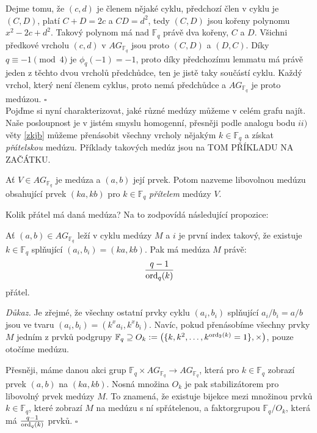 \documentclass[12pt]{report}
\begin{document}
Dejme tomu, že $(c,d)$ je členem nějaké cyklu, předchozí člen v cyklu je $(C,D)$, platí $C+D=2c$ a $CD = d^2$, tedy $(C,D)$ jsou kořeny polynomu $x^2-2c+d^2$. Takový polynom má nad $\mathbb{F}_q$ právě dva kořeny, $C$ a $D$. Všichni předkové vrcholu $(c,d)$ v $AG_{\mathbb{F}_q}$ jsou proto $(C,D)$ a $(D,C)$. Díky $q \equiv -1 \pmod{4}$ je $\phi_q(-1)=-1$, proto díky předchozímu lemmatu má právě jeden z těchto dvou vrcholů předchůdce, ten je jistě taky součástí cyklu. Každý vrchol, který není členem cyklus, proto nemá předchůdce a $AG_{\mathbb{F}_q}$ je proto medúzou. \hfill $\square$\\


Pojďme si nyní charakterizovat, jaké různé medúzy můžeme v celém grafu najít. Naše posloupnost je v jistém smyslu homogenní, přesněji podle analogu bodu $ii)$ věty \ref{zkjb}  můžeme přenásobit všechny vrcholy nějakým $k \in \mathbb{F}_q$ a získat \textit{přátelskou} medúzu. Příklady takových medúz jsou na TOM PŘÍKLADU NA ZAČÁTKU.
\begin{definice}
Ať $V \in AG_{\mathbb{F}_q}$ je medúza a $(a,b)$ její prvek. Potom nazveme libovolnou medúzu obsahující prvek $(ka,kb)$ pro $k \in \mathbb{F}_q$ \textit{přítelem} medúzy $V$.
\end{definice}

 Kolik přátel má daná medúza? Na to zodpovídá následující propozice:
\begin{veta}\label{isom}
Ať $(a,b) \in AG_{\mathbb{F}_q}$ leží v cyklu medúzy $M$ a $i$ je první index takový, že existuje $k \in \mathbb{F}_q$ splňující $(a_i,b_i) = (ka, kb)$. Pak má medúza $M$ právě:
$$\frac{q-1}{\operatorname{ord}_q (k)}$$
přátel.
\end{veta}

\noindent \textit{Důkaz.} Je zřejmé, že všechny ostatní prvky cyklu $(a_i,b_i)$ splňující $a_i/b_i = a/b$ jsou ve tvaru $(a_i,b_i) = (k^x a_i, k^x b_i)$. Navíc, pokud přenásobíme všechny prvky $M$ jedním z prvků podgrupy $\mathbb{F}_q \supseteq O_k := \left( \lbrace k, k^2, \dots, k^{\operatorname{ord}_2 (k)} = 1 \rbrace, \times \right)$, pouze otočíme medúzu.

Přesněji, máme danou akci grup $\mathbb{F}_q \times AG_{\mathbb{F}_q} \longrightarrow AG_{\mathbb{F}_q}$, která pro $k \in \mathbb{F}_q$ zobrazí prvek $(a,b)$ na $(ka,kb)$. Nosná množina $O_k$ je pak stabilizátorem pro libovolný prvek medúzy $M$. To znamená, že existuje bijekce mezi množinou prvků $k \in \mathbb{F}_q$, které zobrazí $M$ na medúzu s ní spřátelenou, a faktorgrupou $\mathbb{F}_q/O_k$, která má $\frac{q-1}{\operatorname{ord}_q (k)}$ prvků. \hfill $\square$\\
\end{document}
